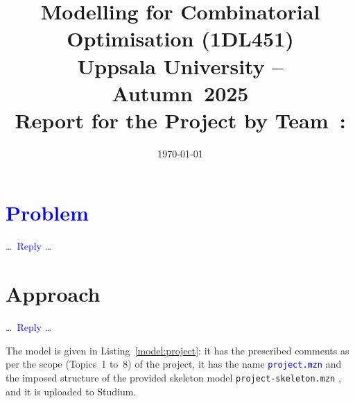\documentclass[a4paper,11pt,hidelinks]{article}
\title{\textbf{Modelling for Combinatorial Optimisation (1DL451) \\
    Uppsala University -- Autumn~2025 \\
    Report for the Project
    by Team~\todo{t}: \\                      %
    \Problem
  }
}
\author{\todo{Clara CLÄVER and Whiz KIDD}}
\date{\today}
\renewcommand{\todo}[1]{\textcolor{blue}{#1}} %
\newcommand{\Problem}{\todo{Problem}\xspace}  %
\begin{document}
\maketitle


\section{\Problem}


\todo{\dots\ Reply \dots}


\section{Approach}


\todo{\dots\ Reply \dots}

The model is given in Listing~\ref{model:project}: it has the
prescribed comments as per the scope (Topics~1 to~8) of the project,
it has the name \todo{\texttt{project.mzn}}             %
and the imposed structure of the provided skeleton model
\texttt{project-skeleton.mzn}%
, and it is uploaded to Studium.

\end{document}
